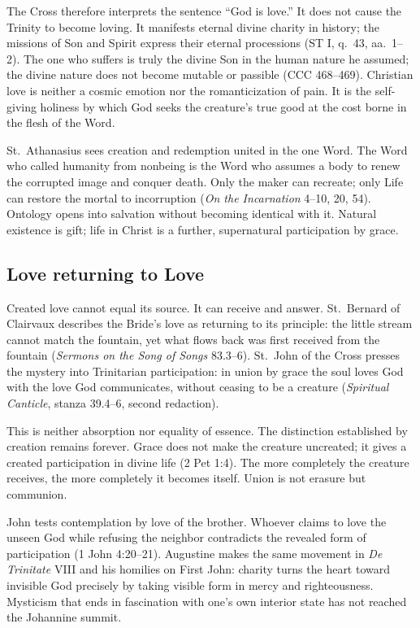 The Cross therefore interprets the sentence ``God is love.'' It does not cause the Trinity to become loving. It manifests eternal divine charity in history; the missions of Son and Spirit express their eternal processions (ST I, q.~43, aa.~1--2). The one who suffers is truly the divine Son in the human nature he assumed; the divine nature does not become mutable or passible (CCC 468--469). Christian love is neither a cosmic emotion nor the romanticization of pain. It is the self-giving holiness by which God seeks the creature's true good at the cost borne in the flesh of the Word.

St.~Athanasius sees creation and redemption united in the one Word. The Word who called humanity from nonbeing is the Word who assumes a body to renew the corrupted image and conquer death. Only the maker can recreate; only Life can restore the mortal to incorruption (\emph{On the Incarnation} 4--10, 20, 54). Ontology opens into salvation without becoming identical with it. Natural existence is gift; life in Christ is a further, supernatural participation by grace.

\subsection{Love returning to Love}

Created love cannot equal its source. It can receive and answer. St.~Bernard of Clairvaux describes the Bride's love as returning to its principle: the little stream cannot match the fountain, yet what flows back was first received from the fountain (\emph{Sermons on the Song of Songs} 83.3--6). St.~John of the Cross presses the mystery into Trinitarian participation: in union by grace the soul loves God with the love God communicates, without ceasing to be a creature (\emph{Spiritual Canticle}, stanza 39.4--6, second redaction).

This is neither absorption nor equality of essence. The distinction established by creation remains forever. Grace does not make the creature uncreated; it gives a created participation in divine life (2 Pet 1:4). The more completely the creature receives, the more completely it becomes itself. Union is not erasure but communion.

John tests contemplation by love of the brother. Whoever claims to love the unseen God while refusing the neighbor contradicts the revealed form of participation (1 John 4:20--21). Augustine makes the same movement in \emph{De Trinitate} VIII and his homilies on First John: charity turns the heart toward invisible God precisely by taking visible form in mercy and righteousness. Mysticism that ends in fascination with one's own interior state has not reached the Johannine summit.

